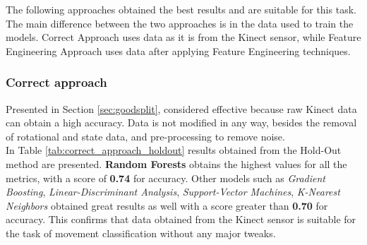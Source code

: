                 The following approaches obtained the best results and are suitable for this task. The main difference between the two approaches is in the data used to train the models. Correct Approach uses data as it is from the Kinect sensor, while Feature Engineering Approach uses data after applying Feature Engineering techniques.
                
            \subsubsection{Correct approach}

                Presented in Section \ref{sec:goodsplit}, considered effective because raw Kinect data can obtain a high accuracy. Data is not modified in any way, besides the removal of rotational and state data, and pre-processing to remove noise.\\
                 
                In Table \ref{tab:correct_approach_holdout} results obtained from the Hold-Out method are presented. \textbf{Random Forests} obtains the highest values for all the metrics, with a score of \textbf{0.74} for accuracy. Other models such as \textit{Gradient Boosting}, \textit{Linear-Discriminant Analysis}, \textit{Support-Vector Machines}, \textit{K-Nearest Neighbors} obtained great results as well with a score greater than \textbf{0.70} for accuracy. This confirms that data obtained from the Kinect sensor is suitable for the task of movement classification without any major tweaks.\\
                
                \newpage

